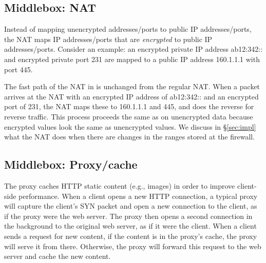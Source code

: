\subsection{Middlebox: NAT}\label{sec:nat}






Instead of mapping unencrypted addresses/ports to public IP addresses/ports, the NAT maps IP addresses/ports that are {\em encrypted} to public IP addresses/ports. 
Consider an example: an encrypted private IP address ab12:342:: and encrypted private port 231 are mapped to a public IP address 160.1.1.1 with port 445.

The fast path of the NAT in \sys{} is unchanged from the regular NAT. 
When a packet arrives at the NAT with an encrypted   IP address of ab12:342:: and an encrypted port of 231, the NAT maps these to 160.1.1.1 and 445, and does the reverse for reverse traffic. 
This process proceeds the same as on unencrypted data because encrypted values look the same as unencrypted values. 
We discuss in \S\ref{sec:impl} what the NAT does when there are changes in the ranges stored at the firewall. 

%

\subsection{Middlebox: Proxy/cache}\label{s:proxy}

The proxy  caches HTTP static content (e.g., images) in order to improve client-side performance. 
When a client opens a new HTTP connection, a typical proxy will capture the client's SYN packet and open a new connection to the client, as if the proxy were the web server. The proxy then opens a second connection in the background to the original web server, as if it were the client. 
When a client sends a request for new content, if the content is in the proxy's cache, the proxy will serve it from there. Otherwise, the proxy will forward this request to the web server and cache the new content. 

